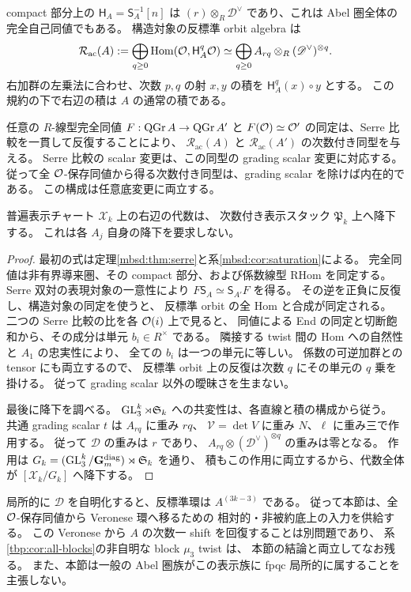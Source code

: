 \begin{corollary}[反標準切断環の内在性と表示スタックへの降下]
\label{mbsd:cor:anticanonical}
compact 部分上の $\mathsf H_A=\mathsf S_A^{-1}[n]$ は
$(r)\otimes_R\mathscr D^\vee$ であり、これは Abel 圏全体の完全自己同値でもある。
構造対象の反標準 orbit algebra は
\begin{equation}\label{mbsd:eq:anticanonical-ring}
 \mathcal R_{\mathrm{ac}}(A)
 :=\bigoplus_{q\geq0}\operatorname{Hom}(\mathcal O,\mathsf H_A^q\mathcal O)
 \simeq\bigoplus_{q\geq0}A_{rq}\otimes_R(\mathscr D^\vee)^{\otimes q}.
\end{equation}
右加群の左乗法に合わせ、次数 $p,q$ の射 $x,y$ の積を
$\mathsf H_A^q(x)\circ y$ とする。
この規約の下で右辺の積は $A$ の通常の積である。

任意の $R$-線型完全同値 $F:\operatorname{QGr} A\to\operatorname{QGr} A'$ と
$F(\mathcal O)\simeq\mathcal O'$ の同定は、Serre 比較を一貫して反復することにより、
$\mathcal R_{\mathrm{ac}}(A)$ と $\mathcal R_{\mathrm{ac}}(A')$ の次数付き同型を与える。
Serre 比較の scalar 変更は、この同型の grading scalar 変更に対応する。
従って全 $\mathcal O$-保存同値から得る次数付き同型は、grading scalar を除けば内在的である。
この構成は任意底変更に両立する。

普遍表示チャート $\mathcal X_k$ 上の右辺の代数は、
次数付き表示スタック $\mathfrak P_k$ 上へ降下する。
これは各 $A_j$ 自身の降下を要求しない。
\end{corollary}
\begin{proof}
最初の式は定理\ref{mbsd:thm:serre}と系\ref{mbsd:cor:saturation}による。
完全同値は非有界導来圏、その compact 部分、および係数線型 RHom を同定する。
Serre 双対の表現対象の一意性により
$F\mathsf S_A\simeq\mathsf S_{A'}F$ を得る。
その逆を正負に反復し、構造対象の同定を使うと、
反標準 orbit の全 Hom と合成が同定される。
二つの Serre 比較の比を各 $\mathcal O(i)$ 上で見ると、
同値による End の同定と切断飽和から、その成分は単元 $b_i\in R^\times$ である。
隣接する twist 間の Hom への自然性と $A_1$ の忠実性により、
全ての $b_i$ は一つの単元に等しい。
係数の可逆加群との tensor にも両立するので、
反標準 orbit 上の反復は次数 $q$ にその単元の $q$ 乗を掛ける。
従って grading scalar 以外の曖昧さを生まない。

最後に降下を調べる。
$\operatorname{GL}_3^k\rtimes\mathfrak S_k$ への共変性は、各直線と積の構成から従う。
共通 grading scalar $t$ は $A_{rq}$ に重み $rq$、
$\mathscr V=\det V$ に重み $N$、$\ell$ に重み三で作用する。
従って $\mathscr D$ の重みは $r$ であり、
$A_{rq}\otimes(\mathscr D^\vee)^{\otimes q}$ の重みは零となる。
作用は $G_k=(\operatorname{GL}_3^k/\mathbf G_m^{\mathrm{diag}})\rtimes\mathfrak S_k$ を通り、
積もこの作用に両立するから、代数全体が $[\mathcal X_k/G_k]$ へ降下する。
\end{proof}

\begin{remark}[次数一認識との区別]
局所的に $\mathscr D$ を自明化すると、反標準環は $A^{(3k-3)}$ である。
従って本節は、全 $\mathcal O$-保存同値から Veronese 環へ移るための
相対的・非被約底上の入力を供給する。
この Veronese から $A$ の次数一 shift を回復することは別問題であり、
系\ref{tbp:cor:all-blocks}の非自明な block $\mu_3$ twist は、
本節の結論と両立してなお残る。
また、本節は一般の Abel 圏族がこの表示族に fpqc 局所的に属することを主張しない。
\end{remark}
